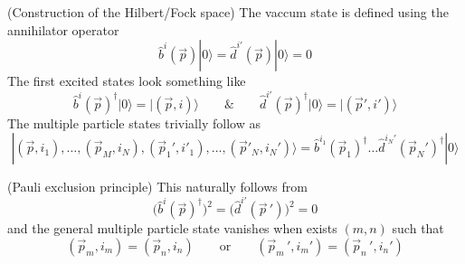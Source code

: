 \vspace{2ex}
\begin{defi}
(Construction of the Hilbert/Fock space) The vaccum state is defined using the annihilator operator 
\[\hat{b}^{i}(\vec{p})|0\rangle =\hat{d}^{i'}(\vec{p})|0\rangle =0\]
The first excited states look something like
\[\hat{b}^{i}(\vec{p})^{\dagger}|0\rangle =|(\vec{p},i)\rangle \qquad\&\qquad \hat{d}^{i'}(\vec{p})^{\dagger}|0\rangle =|(\vec{p}',i')\rangle \]
The multiple particle states trivially follow as
\[|(\vec{p},i_1),\ldots ,(\vec{p}_{M},i_{N}),(\vec{p}_{1}',i'_{1}),\ldots ,(\vec{p}'_{N},i_{N}')\rangle =\hat{b}^{i_1}(\vec{p}_{1})^{\dagger}\ldots \hat{d}^{i_{N}'}(\vec{p}_{N}')^{\dagger}|0\rangle \]
\end{defi}
\vspace{2ex}
\begin{thm}
(Pauli exclusion principle) This naturally follows from
\[\Big(\hat{b}^{i}(\vec{p})^{\dagger}\Big)^2=\Big(\hat{d}^{i'}(\vec{p}\,')\Big)^2=0\]
and the general multiple particle state vanishes when exists $(m,n)$ such that
\[(\vec{p}_{m},i_{m})=(\vec{p}_{n},i_{n})\qquad\mathrm{or}\qquad (\vec{p}_{m}\,',i_{m}')=(\vec{p}_{n}\,',i_{n}')\]
\end{thm}
\vspace{2ex}
